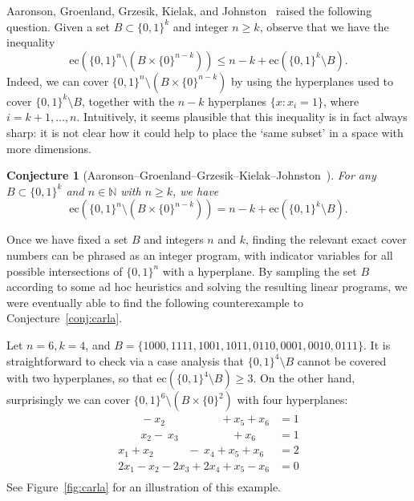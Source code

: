 \documentclass[11pt,english]{article}
\theoremstyle{plain}
\newtheorem{conjecture}[theorem]{Conjecture}
\theoremstyle{remark}
\begin{document}
Aaronson, Groenland, Grzesik, Kielak, and Johnston~\cite{aaronson} raised the following question. Given a set $B\subset \{0,1\}^k$ and integer $n\geq k$, observe that we have the inequality
\begin{equation*}
    \text{ec}(\{0,1\}^{n} \setminus (B\times \{0\}^{n-k})) \leq n-k + \text{ec}(\{0,1\}^k\setminus B).
\end{equation*}
Indeed, we can cover $\{0,1\}^{n} \setminus (B\times \{0\}^{n-k})$ by using the hyperplanes used to cover $\{0,1\}^k\setminus B$, together with the $n-k$ hyperplanes $\{x:x_i=1\}$, where $i=k+1,\ldots,n$. Intuitively, it seems plausible that this inequality is in fact always sharp: it is not clear how it could help to  place the ‘same subset’ in a space with more dimensions. 
\begin{conjecture}[\label{conj:carla}Aaronson--Groenland--Grzesik--Kielak--Johnston~\cite{aaronson}]
For any $B\subset \{0,1\}^k$ and $n\in\mathbb{N}$ with $n\geq k$, we have
$$\text{ec}(\{0,1\}^{n} \setminus (B\times \{0\}^{n-k})) = n-k + \text{ec}(\{0,1\}^k\setminus B).$$
\end{conjecture}

Once we have fixed a set $B$ and integers $n$ and $k$, finding the relevant exact cover numbers can be phrased as an integer program, with indicator variables for all possible intersections of $\{0,1\}^n$ with a hyperplane. By sampling the set $B$ according to some ad hoc heuristics and solving the resulting linear programs, we were eventually able to find the following counterexample to Conjecture~\ref{conj:carla}.

Let $n=6, k=4$, and   $B = \{1000, 1111, 1001, 1011, 0110, 0001, 0010, 0111\}$. It is straightforward to check via a case analysis that $\{0,1\}^4 \setminus B$ cannot be covered with two hyperplanes, so that $\text{ec}(\{0,1\}^4\setminus B)\geq 3$. On the other hand, surprisingly we can cover $\{0, 1\}^6 \setminus (B \times \{0\}^2)$ with four hyperplanes:
\begin{equation*}
\begin{split}
        \qquad - x_2 ~ \qquad ~ ~ ~  \qquad  +x_5       +x_6 &=1\\
        \qquad     x_2 - ~ x_3 ~ ~ ~  \qquad \qquad      +x_6 &=1\\
        x_1  + x_2 \qquad \quad     - ~ x_4 +x_5     +x_6 &=2\\
        2x_1 - x_2  -2x_3 +2x_4+x_5     -x_6 &=0\\
\end{split}
\end{equation*}
See Figure~\ref{fig:carla} for an illustration of this example.
\end{document}
